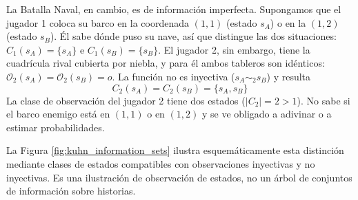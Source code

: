 La Batalla Naval, en cambio, es de información imperfecta. Supongamos que el jugador 1 coloca su barco en la coordenada $(1,1)$ (estado $s_A$) o en la $(1,2)$ (estado $s_B$). Él sabe dónde puso su nave, así que distingue las dos situaciones: $C_1(s_A) = \{s_A\}$ e $C_1(s_B) = \{s_B\}$. El jugador 2, sin embargo, tiene la cuadrícula rival cubierta por niebla, y para él ambos tableros son idénticos: $\mathcal{O}_2(s_A) = \mathcal{O}_2(s_B) = o$. La función no es inyectiva ($s_A \sim_2 s_B$) y resulta
\begin{equation}
    C_2(s_A) = C_2(s_B) = \{s_A, s_B\}
    \label{eq:batalla-naval-informacion-imperfecta}
\end{equation}
La clase de observación del jugador 2 tiene dos estados ($|C_2| = 2 > 1$). No sabe si el barco enemigo está en $(1,1)$ o en $(1,2)$ y se ve obligado a adivinar o a estimar probabilidades.

La Figura \ref{fig:kuhn_information_sets} ilustra esquemáticamente esta distinción mediante clases de estados compatibles con observaciones inyectivas y no inyectivas. Es una ilustración de observación de estados, no un árbol de conjuntos de información sobre historias.

